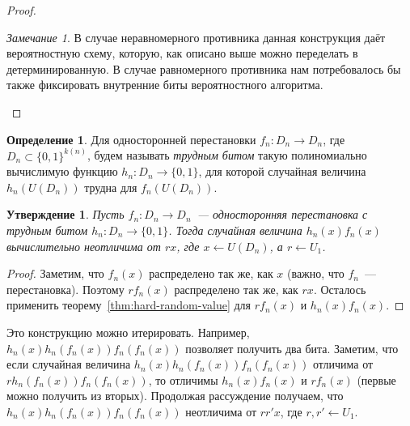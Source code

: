 \documentclass[12pt,a4paper]{article}
\newcommand{\bits}{\{0,1\}}
\theoremstyle{definition}
\newtheorem{definition}{Определение}[section]
\theoremstyle{plain}
\newtheorem{statement}{Утверждение}[section]
\theoremstyle{remark}
\newtheorem{remark}{Замечание}[section]
\begin{document}
\begin{proof}
\begin{itemize}
\begin{remark}
В случае неравномерного противника данная конструкция даёт вероятностную схему, 
которую, как описано выше можно переделать в детерминированную. В случае равномерного
противника нам потребовалось бы также фиксировать внутренние биты вероятностного алгоритма.
\end{remark}
\end{itemize}
\end{proof}

\begin{definition}
Для односторонней перестановки $f_n: D_n\to D_n$, где $D_n\subset\bits^{k(n)}$,
будем называть \emph{трудным битом} такую полиномиально вычислимую функцию $h_n: D_n\to\bits$,
для которой случайная величина
$h_n(U(D_n))$ трудна для $f_n(U(D_n))$. 
\end{definition}

\begin{statement}\label{st:hard-bit}
Пусть $f_n:D_n\to D_n$~--- односторонняя перестановка с трудным битом $h_n: D_n\to\bits$.
Тогда случайная величина $h_n(x)f_n(x)$ вычислительно неотличима от $r x$, где $x\gets U(D_n)$,
а $r\gets U_1$.
\end{statement}
\begin{proof}
Заметим, что $f_n(x)$ распределено так же, как $x$ (важно, что $f_n$~--- перестановка). Поэтому
$r f_n(x)$ распределено так же, как $r x$. Осталось применить теорему~\ref{thm:hard-random-value}
для $r f_n(x)$ и $h_n(x)f_n(x)$.
\end{proof}

Это конструкцию можно итерировать. Например, $h_n(x) h_n(f_n(x)) f_n(f_n(x))$ позволяет получить 
два бита. Заметим, что если случайная величина $h_n(x) h_n(f_n(x)) f_n(f_n(x))$ отличима 
от $r h_n(f_n(x)) f_n(f_n(x))$, то отличимы $h_n(x) f_n(x)$ и $r f_n(x)$ (первые можно получить из вторых).
Продолжая рассуждение получаем, что $h_n(x) h_n(f_n(x)) f_n(f_n(x))$ неотличима от $rr'x$, где $r,r'\gets U_1$.
\end{document}
